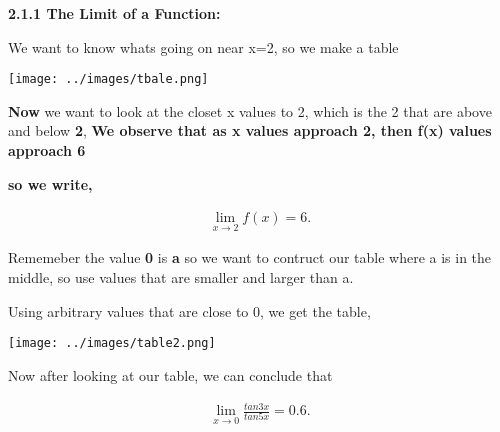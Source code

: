 \documentclass{report}
\begin{document}
    \pagebreak
    \begin{Large}
        \textbf{2.1.1 The Limit of a Function:}
    \end{Large}
    
   \bigbreak \noindent \bigbreak \noindent  

    \bigbreak \noindent 
    We want to know whats going on near x=2, so we make a table

    \bigbreak \noindent 
    \begin{center}
        \texttt{[image: ../images/tbale.png]}
    \end{center}

    \textbf{Now} we want to look at the closet x values to 2, 
    which is the 2 that are above and below \textbf{2}, \textbf{We observe that as x values approach
    2, then f(x) values approach 6}

    \bigbreak \noindent 
    \textbf{so we write,}    

    \begin{large}
        \begin{align*}
            \lim\limits_{x \to 2}{f \left(x\right) = 6}
        .\end{align*}
    \end{large}
    
    \bigbreak \noindent 
    
    \bigbreak \noindent 
    Rememeber the value \textbf{0} is \textbf{a} so we want to contruct our table where a 
    is in the middle, so use values that are smaller and larger than a.

    \bigbreak \noindent 
    Using arbitrary values that are close to 0, we get the table, 

    \bigbreak \noindent 
    \begin{center}
        \texttt{[image: ../images/table2.png]}
    \end{center}
    
    \bigbreak \noindent 
    Now after looking at our table, we can conclude that

    \bigbreak \noindent 

    \begin{large}
        \begin{align*}
            \lim\limits_{x \to0 }{ \frac{tan3x}{tan5x} = 0.6}
        .\end{align*}
    \end{large}
\end{document}
